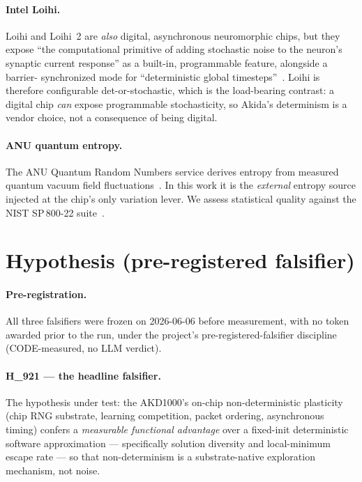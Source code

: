 \documentclass[11pt,a4paper]{article}
\begin{document}
\paragraph{Intel Loihi.} Loihi and Loihi~2 are \emph{also} digital,
asynchronous neuromorphic chips, but they expose ``the computational
primitive of adding stochastic noise to the neuron's synaptic current
response'' as a built-in, programmable feature, alongside a barrier-
synchronized mode for ``deterministic global
timesteps''~\cite{openNeuromorphicLoihi2,shresthaLoihi2}. Loihi is therefore
configurable det-or-stochastic, which is the load-bearing contrast: a
digital chip \emph{can} expose programmable stochasticity, so Akida's
determinism is a vendor choice, not a consequence of being digital.

\paragraph{ANU quantum entropy.} The ANU Quantum Random Numbers service
derives entropy from measured quantum vacuum field
fluctuations~\cite{anuQRNG,symulVacuumQRNG}. In this work it is the
\emph{external} entropy source injected at the chip's only variation lever.
We assess statistical quality against the NIST SP\,800-22 suite~\cite{nistSP80022}.

\section{Hypothesis (pre-registered falsifier)}
\label{sec:hypothesis}

\paragraph{Pre-registration.} All three falsifiers were frozen on
2026-06-06 before measurement, with no token awarded prior to the run, under
the project's pre-registered-falsifier discipline (CODE-measured, no LLM
verdict).

\paragraph{H\_921 --- the headline falsifier.} The hypothesis under test:
the AKD1000's on-chip non-deterministic plasticity (chip RNG substrate,
learning competition, packet ordering, asynchronous timing) confers a
\emph{measurable functional advantage} over a fixed-init deterministic
software approximation --- specifically solution diversity and
local-minimum escape rate --- so that non-determinism is a substrate-native
exploration mechanism, not noise.
\end{document}
